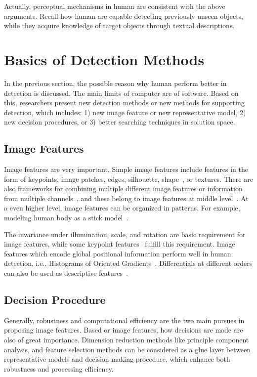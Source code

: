 Actually, perceptual mechanisms in human are consistent with the above arguments. Recall how human are capable detecting previously unseen objects, while they acquire knowledge of target objects through textual descriptions.

\section{Basics of Detection Methods}

In the previous section, the possible reason why human perform better in detection is discussed. The main limits of computer are of software. Based on this, researchers present new detection methods or new methods for supporting detection, which includes: 1) new image feature or new representative model, 2) new decision procedures, or 3) better searching techniques in solution space.
\subsection{Image Features}
Image features are very important. Simple image features include features in the form of keypoints, image patches, edges,  silhouette, shape~\cite{scontext}, or textures. There are also frameworks for combining multiple different image features or information from multiple channels~\cite{regionc,bgf,lbp,lss}, and these belong to image features at middle level~\cite{midf}. At a even higher level, image features can be  organized in patterns. For example, modeling human body as a stick model~\cite{stickb}.

The invariance under illumination, scale, and rotation are basic requirement for image features, while some keypoint features~\cite{ij2,o12,o14,o15,o2} fulfill this requirement. Image features which encode global positional information perform well in human detection, i.e., Histograms of Oriented
Gradients~\cite{ij4}. Differentials at different orders can also be used as descriptive features~\cite{ij6}.



\subsection{Decision Procedure}
Generally, robustness and computational efficiency are the two main pursues in proposing image features. Based or image features, how decisions are made are also of great importance. Dimension reduction methods like principle component analysis, and feature selection methods can be considered as a glue layer between representative models and decision making procedure, which enhance both robustness and processing efficiency.

